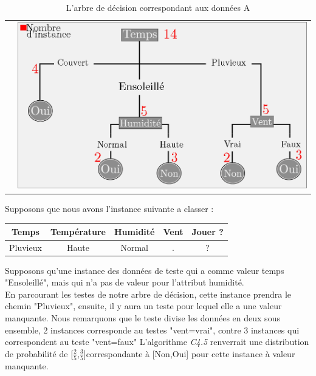 \documentclass[a4paper, 11pt]{report}
\begin{document}
\begin{table}[!h]
\begin{small}
\begin{tabular}{cc}
\begin{minipage}{.5\linewidth}
      \caption{Sous ensemble F}

    \end{minipage} &

    \begin{minipage}{.5\linewidth}
\includegraphics[scale=1.8]{figure_GI2}
\caption{L'arbre de décision correspondant aux données A}
    \end{minipage} 
\end{tabular}
\end{small}
\end{table}











Supposons que nous avons l'instance suivante a classer :\\
\begin{center}
\begin{tabular}{| c | c | c | c | c |}
\hline 
Temps & Température & Humidité & Vent & Jouer ? \\
\hline
Pluvieux & Haute & Normal & . & ? \\
\hline 
\end{tabular}
\end{center}


Supposons qu'une instance des données de teste qui a comme valeur temps "Ensoleillé", mais qui n'a pas de valeur pour l'attribut humidité.\\
En parcourant les testes de notre arbre de décision, cette instance prendra le chemin "Pluvieux", ensuite, il y aura un teste pour lequel elle a une valeur manquante.
Nous remarquons que le teste divise les données en deux sous ensemble, 2 instances corresponde au testes "vent=vrai", contre 3 instances qui correspondent au teste "vent=faux"
L'algorithme \emph{C4.5} renverrait une distribution de probabilité de [$\frac{2}{5}$,$\frac{3}{5}$]correspondante à [Non,Oui] pour cette instance à valeur manquante.
\end{document}
